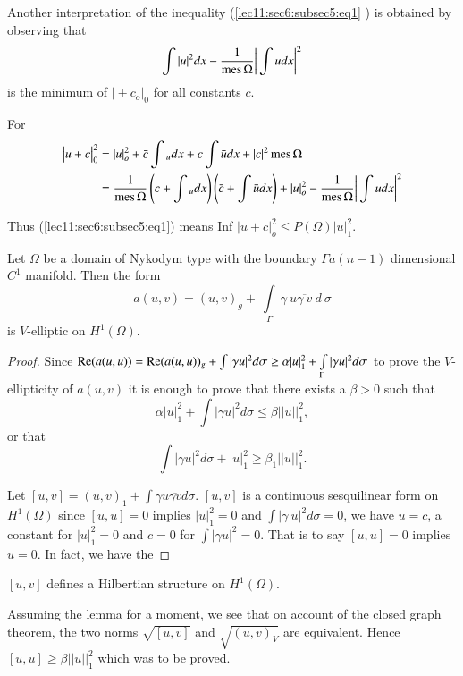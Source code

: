 Another interpretation of the inequality (\ref{lec11:sec6:subsec5:eq1} ) is obtained by observing that 
$$
\int |u|^2 dx - \frac{1}{\operatorname{mes} \Omega}\bigg|\int u dx \bigg |^2
$$
is the minimum of $\big | + c_o \big |_0$ for all constants $c$.

For\pageoriginale
\begin{align*}
  \big| u +c \big|^2_0  &= |u|^2_o + \bar{c}\int {}_u dx + c
  \int \bar{u} dx + |c|^2 \operatorname{mes} \Omega \\ 
  & = \frac{1}{\operatorname{mes} \Omega} \left(c + \int {}_u dx \right) \left(\bar{c} +
  \int \bar{u} dx \right)+
  |u|^2_o - \frac{1}{\operatorname{mes} \Omega}\bigg| \int udx \bigg|^2 
\end{align*} 

Thus (\ref{lec11:sec6:subsec5:eq1}) means Inf $| u + c|^2_o \le P (\Omega) |u|^2_1$.

\begin{theorem}\label{lec11:sec6:subsec5:thm6.8}  %
  Let $\Omega$ be a domain of Nykodym type with the boundary $\Gamma
  a(n-1)$ dimensional $C^1$ manifold. Then the form  
  $$
  a(u, v) = (u, v)_g + ~ \int\limits_{\Gamma}~ \gamma~ u \overline{\gamma ~
  v}~ d~ \sigma 
  $$
  is $V$-elliptic on $H^1(\Omega)$.
\end{theorem}

\begin{proof}
Since $\operatorname{Re}  (a(u, u)) = \operatorname{Re}  (a(u, u))_g + \int |\gamma u|^2 d \sigma
\geq \alpha |u|^2_1 + \int\limits_\Gamma |\gamma u|^2 d \sigma$ to prove the
$V$-ellipticity of $a(u, v)$ it is enough to prove that there exists a
$\beta > 0$ such that  
$$
\alpha |u|^2_1 + \int |\gamma u|^2 d \sigma \leq \beta || u || ^2_1, 
$$
or that 
$$
\int |\gamma u |^2 d \sigma + |u |^2_1 \geq \beta_1 || u ||^2_1.
$$

Let $[u, v]= (u, v)_1 +  \int \gamma u \overline{\gamma v} d
\sigma$. $[u, v]$ is a 
continuous sesquilinear form on $H^1(\Omega)$ since $[u, u] = 0$
implies $|u|^2_1 =0$ and $\int |\gamma~ u|^2 d \sigma = 0$, we have $u
= c$, a constant for $|u|^2_1 = 0$ and $c = 0$ for $\int |\gamma u|^2
= 0$. That is to say $[u, u] = 0$ implies $u = 0$. In fact, we have
the  
\end{proof}

\begin{lemma*}
  $[u, v]$ defines a Hilbertian structure on $H^1(\Omega)$. 
\end{lemma*}

Assuming the lemma for a moment, we see that on account of the closed
graph theorem, the two norms $\sqrt{[u, v]}$ and $\sqrt{(u, v)_V}$ are
equivalent. Hence $[u, u]\geq \beta || u || ^2_1$ which was to be
proved.  

